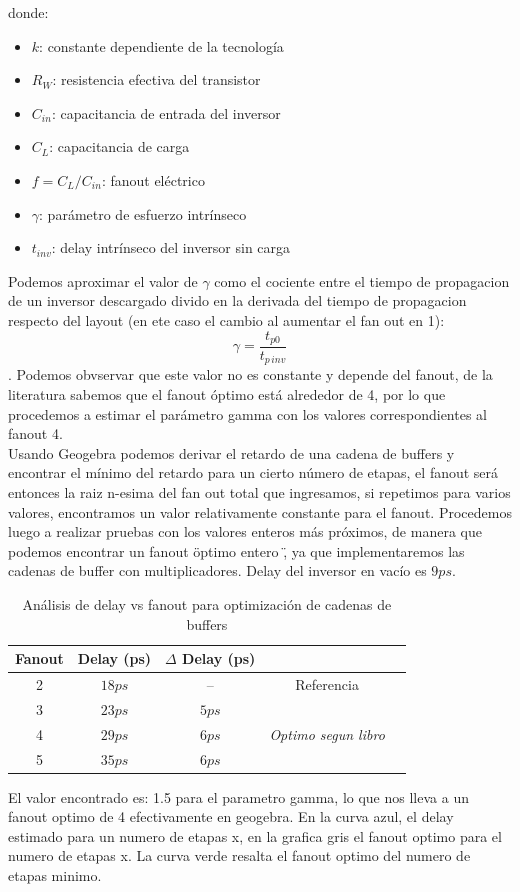\documentclass[12pt,a4paper]{report}
\begin{document}
donde:
\begin{itemize}
    \item $k$: constante dependiente de la tecnología
    \item $R_W$: resistencia efectiva del transistor
    \item $C_{in}$: capacitancia de entrada del inversor
    \item $C_L$: capacitancia de carga
    \item $f = C_L / C_{in}$: fanout eléctrico
    \item $\gamma$: parámetro de esfuerzo intrínseco
    \item $t_{inv}$: delay intrínseco del inversor sin carga
\end{itemize}
Podemos aproximar el valor de $\gamma$ como el cociente entre el tiempo de propagacion de un inversor descargado divido en la derivada del tiempo de propagacion respecto del layout (en ete caso el cambio al aumentar el fan out en 1): \begin{equation}
\gamma = \frac{t_{p0}}{t_{p \, inv}}
\end{equation}. Podemos obvservar que este valor no es constante y depende del fanout, de la literatura sabemos que el fanout óptimo está alrededor de 4, por lo que procedemos a estimar el parámetro gamma con los valores correspondientes al fanout 4. \\
Usando Geogebra podemos derivar el retardo de una cadena de buffers  y encontrar el mínimo del retardo para un cierto número de etapas, el fanout será entonces la raiz n-esima del fan out total que ingresamos, si repetimos para varios valores, encontramos un valor relativamente constante para el fanout. Procedemos luego a realizar pruebas con los valores enteros más próximos, de manera que podemos encontrar un fanout \" optimo entero \", ya que implementaremos las cadenas de buffer con multiplicadores. 
Delay del inversor en vacío  es $9ps$.
\begin{table}[h]
\centering
\caption{Análisis de delay vs fanout para optimización de cadenas de buffers}
\label{tab:buffer_fanout_optimization}
\begin{tabular}{ccccc}
\toprule
\textbf{Fanout} & \textbf{Delay (ps)} & \textbf{$\Delta$ Delay (ps)}  \\
\midrule
2 & $18ps$ & -- & Referencia \\
3 & $23ps$ & $5ps$ & \\
4 & $29ps$ & $6ps$ & \textit{Optimo segun libro} \\
5 & $35ps$ & $6ps$ & \\
\bottomrule
\end{tabular}
\end{table}
El valor encontrado es: 1.5 para el parametro gamma, lo que nos lleva a un fanout optimo de 4 efectivamente en geogebra. En la curva azul, el delay estimado para un numero de etapas x, en la grafica gris el fanout optimo para el numero de etapas x. La curva verde resalta el fanout optimo del numero de etapas minimo.
\end{document}
